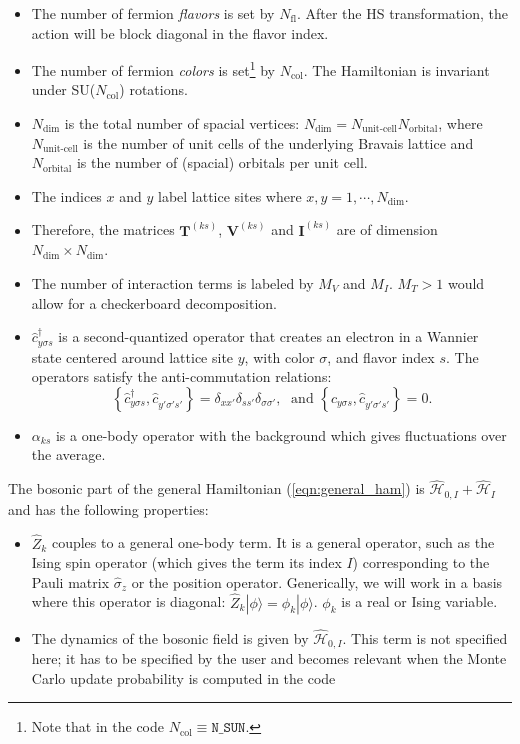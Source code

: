 \begin{itemize}
\item The number of fermion \emph{flavors} is set by $N_{\mathrm{fl}}$.  After the HS transformation, the action will be block diagonal in the flavor index. 
\item The number of fermion \emph{colors} is set\footnote{Note that  in the code $ N_{\mathrm{col}} \equiv \texttt{N\_{SUN}} $.} by $N_{\mathrm{col}}$.    The Hamiltonian is invariant under  SU($N_{\mathrm{col}}$)  rotations.
\item $N_{\mathrm{dim}}$ is the total number of spacial vertices: $N_{\mathrm{dim}}=N_{\text{unit-cell}} N_{\mathrm{orbital}}$, where $N_{\text{unit-cell}}$ is the number of unit cells of the underlying Bravais lattice and $N_{\mathrm{orbital}}$ is the number of (spacial) orbitals per unit cell.
\item The indices $x$ and $y$ label lattice sites where $x,y=1,\cdots, N_{\mathrm{dim}}$. 
\item Therefore, the  matrices $\bm{T}^{(k s)}$, $\bm{V}^{(ks)}$  and $\bm{I}^{(ks)}$ are  of dimension $N_{\mathrm{dim}}\times N_{\mathrm{dim}}$.
\item The number of interaction terms  is labeled by $M_V$   and $M_I$.   $M_T> 1 $ would allow for a checkerboard decomposition.
\item $\hat{c}^{\dagger}_{y \sigma s} $ is a second-quantized operator that creates an electron in a Wannier state centered around lattice site $y$, with color $\sigma$, and  flavor index $s$.  The operators satisfy the anti-commutation relations: 
\begin{equation}
	\left\{ \hat{c}^{\dagger}_{y \sigma s},    \hat{c}^{\phantom\dagger}_{y' \sigma' s'}  \right\}   =   \delta_{xx'}  \delta_{ss'} \delta_{\sigma\sigma'},   
	\; \text{ and } \left\{ \hat{c}^{\phantom\dagger}_{y \sigma s},    \hat{c}^{\phantom\dagger}_{y' \sigma' s'}  \right\}   =0.
\end{equation}
\item $\alpha_{k s}$ is a one-body operator with the background which gives fluctuations over the average.

\end{itemize}
The bosonic  part of the general Hamiltonian (\ref{eqn:general_ham}) is $\hat{\mathcal{H}}_{0,I}+ \hat{\mathcal{H}}_{I}$ and  has the following properties:
\begin{itemize}
\item $\hat{Z}_k$ couples to a general one-body term. It is a general operator, such as the Ising spin operator (which gives the term its index $I$) corresponding to the Pauli matrix $\hat{\sigma}_{z}$ or the position operator.  Generically,  we will work in a basis where this operator is diagonal:  $\hat{Z}_k | \phi \rangle  =  \phi_k | \phi \rangle $. $\phi_k$ is a real   or Ising variable. 
\item  The dynamics of the bosonic field  is given by $\hat{\mathcal{H}}_{0,I}$. This term is not specified here; 
it has to be specified by the user and becomes relevant when the Monte Carlo update probability is computed in the code
\end{itemize}
